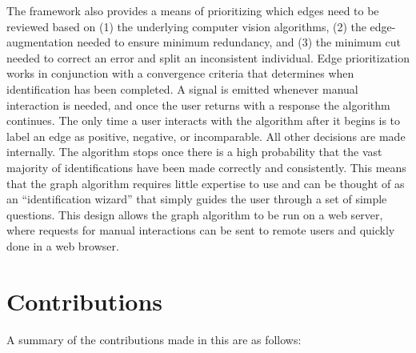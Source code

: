     The framework also provides a means of prioritizing which edges need to be reviewed based on
    (1) the underlying computer vision algorithms,
    (2) the edge-augmentation needed to ensure minimum redundancy, and
    (3) the minimum cut needed to correct an error and split an inconsistent individual.
    Edge prioritization works in conjunction with a convergence criteria that determines when identification has
      been completed.
    A signal is emitted whenever manual interaction is needed, and once the user returns with a response the
      algorithm continues.
    The only time a user interacts with the algorithm after it begins is to label an edge as positive, negative,
      or incomparable.
    All other decisions are made internally.
    The algorithm stops once there is a high probability that the vast majority of identifications have been made
      correctly and consistently.
    This means that the graph algorithm requires little expertise to use and can be thought of as an
      ``identification wizard'' that simply guides the user through a set of simple questions.
    This design allows the graph algorithm to be run on a web server, where requests for manual interactions can
      be sent to remote users and quickly done in a web browser.

    \section{Contributions}\label{sec:contributions}

    A summary of the contributions made in this \thesis{} are as follows:

